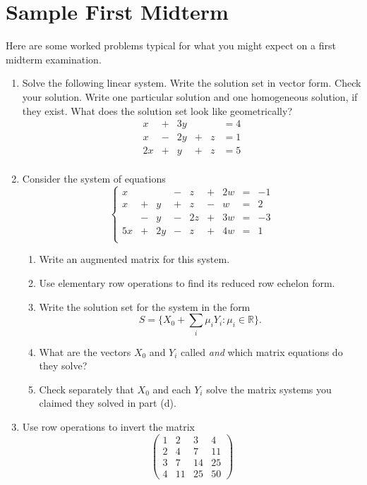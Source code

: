 \chapter{Sample First Midterm}

Here are some worked problems typical for what you might expect on a first midterm examination.
\label{sample1}

\begin{enumerate}
\item Solve the following linear system.  Write the solution set in vector form.  Check your solution.  Write one particular solution and one homogeneous solution, if they exist.  What does the solution set look like geometrically?
\[
\begin{array}{rrrrrr}
x &+&3y & &&= 4\\[1mm]
x &-& 2y &+& z &= 1\\[1mm]
2x &+&y &+& z &= 5\\[1mm]
\end{array}
\]

\item
Consider the system of equations
\[
\left\{
\begin{array}{rrrrrrrrr}
x&&&-&z&+&2w&=&-1\\[2mm]
x&+&y&+&z&-&w&=&2\\[2mm]
&-&y&-&2z&+&3w&=&-3\\[2mm]
5x&+&2y&-&z&+&4w&=&1\\[2mm]
\end{array}
\right. 
\]
\begin{enumerate}
\item Write an augmented matrix for this system.
\item Use elementary row operations to find its reduced row echelon form.
\item Write the solution set for the system in the form \[S=\{X_0+\sum_i \mu_i Y_i:\mu_i\in \mathbb R\} .\]
\item What are the vectors $X_0$ and $Y_i$ called {\itshape and} which matrix equations do they solve?
\item Check separately that $X_0$ and each $Y_i$ solve the matrix systems you claimed they solved in part (d).
\end{enumerate}

\item Use row operations to invert the matrix
\[
\begin{pmatrix}
1&2&3&4\\
2&4&7&11\\
3&7&14&25\\
4&11&25&50
\end{pmatrix}
\]


\end{enumerate}
